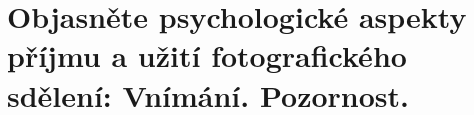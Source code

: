 \section{Objasněte psychologické aspekty příjmu a užití fotografického sdělení: Vnímání. Pozornost.}